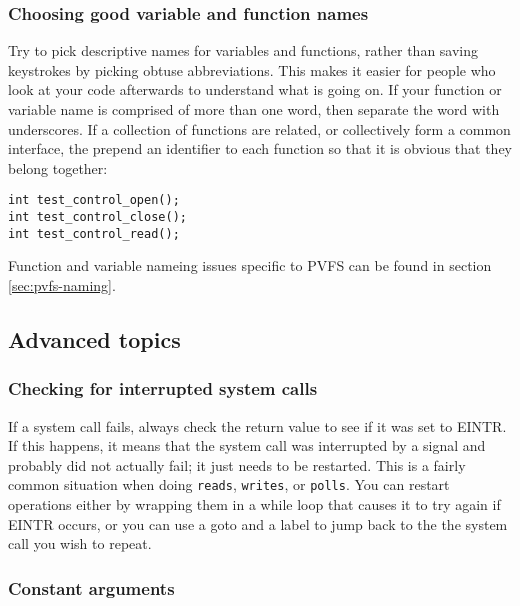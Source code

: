 \documentclass[11pt, letterpaper]{article}
\begin{document}
\subsubsection{Choosing good variable and function names}

Try to pick descriptive names for variables and functions, rather than
saving keystrokes by picking obtuse abbreviations.  This makes it easier
for people who look at your code afterwards to understand what is going
on.  If your function or variable name is comprised of more than one
word, then separate the word with underscores.  If a collection of
functions are related, or collectively form a common interface, the
prepend an identifier to each function so that it is obvious that they
belong together:

\begin{verbatim}
int test_control_open();
int test_control_close();
int test_control_read();
\end{verbatim}

Function and variable nameing issues specific to PVFS can be found in
section \ref{sec:pvfs-naming}.

\subsection{Advanced topics}

\subsubsection{Checking for interrupted system calls}

If a system call fails, always check the return value to see if it was
set to EINTR.  If this happens, it means that the system call was
interrupted by a signal and probably did not actually fail; it just
needs to be restarted.  This is a fairly common situation when doing
{\tt reads}, {\tt writes}, or {\tt polls}.  You can restart operations
either by wrapping them in a while loop that causes it to try again if
EINTR occurs, or you can use a goto and a label to jump back to the the
system call you wish to repeat.

\subsubsection{Constant arguments}
\end{document}
